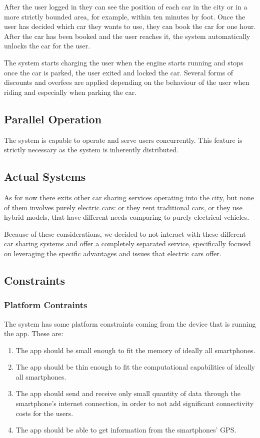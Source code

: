 \documentclass[11pt]{article} %
\begin{document}
  After the user logged in they can see the position of each car in the city or in a more strictly bounded area, for example, within ten minutes by foot. Once the user has decided which car they wants to use, they can book the car for one hour. After the car has been booked and the user reaches it, the system automatically unlocks the car for the user.
  
  The system starts charging the user when the engine starts running and stops once the car is parked, the user exited and locked the car. Several forms of discounts and overfees are applied depending on the behaviour of the user when riding and especially when parking the car.


\subsection{Parallel Operation}
  The system is capable to operate and serve users concurrently. This feature is strictly necessary as the system is inherently distributed.

\subsection{Actual Systems}
As for now there exits other car sharing services operating into the city, but none of them involves purely electric cars: or they rent traditional cars, or they use hybrid models, that have different needs comparing to purely electrical vehicles.

Because of these considerations, we decided to not interact with these different car sharing systems and offer a completely separated service, specifically focused on leveraging the specific advantages and issues that electric cars offer.

 
\subsection{Constraints}

	\subsubsection{Platform Contraints}
The system has some platform constraints coming from the device that is running the app. These are:
\begin{enumerate}
	\item The app should be small enough to fit the memory of ideally all smartphones.
	\item The app should be thin enough to fit the computational capabilities of ideally all smartphones.
	\item The app should send and receive only small quantity of data through the smartphone's internet connection, in order to not add significant connectivity costs for the users.
	\item The app should be able to get information from the smartphones' GPS.
  \end{enumerate}
\end{document}
